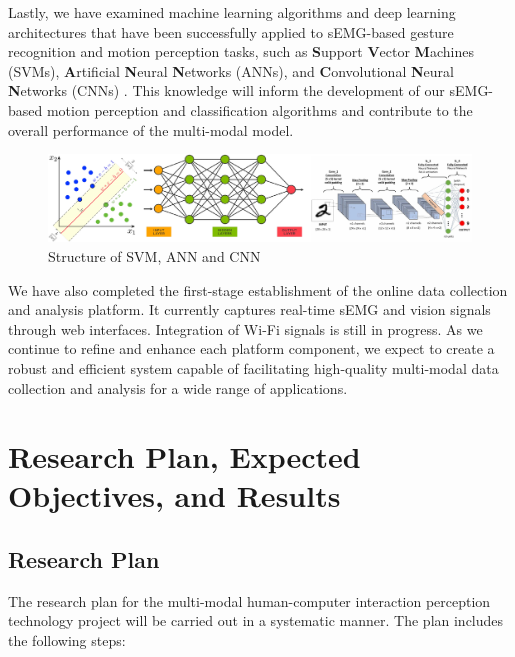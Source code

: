 \documentclass[12pt, a4paper]{article}
\begin{document}
Lastly, we have examined machine learning algorithms and deep learning architectures that have been successfully applied to sEMG-based gesture recognition and motion perception tasks, such as \textbf{S}upport \textbf{V}ector \textbf{M}achines (SVMs), \textbf{A}rtificial \textbf{N}eural \textbf{N}etworks (ANNs), and \textbf{C}onvolutional \textbf{N}eural \textbf{N}etworks (CNNs) \cite{zhai2017self}. This knowledge will inform the development of our sEMG-based motion perception and classification algorithms and contribute to the overall performance of the multi-modal model.

\begin{figure}[ht!]
    \centering
    \includegraphics[width=1.0\textwidth]{image/svm_ann_cnn.pdf}
    \caption{Structure of SVM, ANN and CNN}
    \label{fig:svm_ann_cnn}
\end{figure}

We have also completed the first-stage establishment of the online data collection and analysis platform. It currently captures real-time sEMG and vision signals through web interfaces. Integration of Wi-Fi signals is still in progress. As we continue to refine and enhance each platform component, we expect to create a robust and efficient system capable of facilitating high-quality multi-modal data collection and analysis for a wide range of applications.

\newpage
\section{Research Plan, Expected Objectives, and Results}

\subsection{Research Plan}

The research plan for the multi-modal human-computer interaction perception technology project will be carried out in a systematic manner. The plan includes the following steps:
\end{document}
